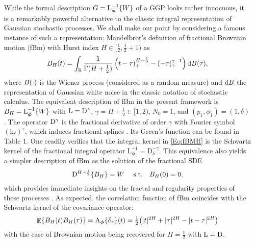 \documentclass[11pt, english,english]{article}
\newcommand{\R}{ \mathbb{R}}
\newcommand{\Lop}{{\rm L}}
\newcommand{\Dop}{{\rm D}}
\newcommand{\dint}{{\rm d}}
\def\V#1{{\boldsymbol{#1}}}         %
\def\Op#1{{\mathrm{#1}}}  %
\def\jj{\mathrm{i}}
\def\Exp{\mathop{\mathbb{E}}\nolimits}
\renewcommand{\[}{\begin{equation}}
\renewcommand{\]}[1]{\label{eq:#1}\end{equation}}
\def\Exp{\mathop{\mathbb{E}}\nolimits}
\def\Rand#1{{\uppercase{#1}}}         %
\def\gRand#1{{\uppercase{ #1}}}         %
\begin{document}
While the formal description $\gRand G=\Op L^{-1}_{\V \phi}\{\gRand W\}$ of a GGP looks rather innocuous, it is a remarkably powerful alternative to the classic integral representation of Gaussian stochastic processes. We shall make our point by considering a
famous instance of such a representation: Mandelbrot's definition \cite{Mandelbrot1968} of fractional Brownian motion (fBm) with Hurst index $H \in\big[\tfrac{1}{2},\tfrac{1}{2}+1 \big)$ as 
\begin{align}
\label{Eq:fBMH}
\Rand B_H(t)=\int_{\R }\frac{1}{\Gamma(H+\frac{1}{2})} \left(t-\tau)^{H-\frac{1}{2}}_+-(-\tau)_+^{\gamma-1}\right)\dint \Rand B(\tau),
\end{align}
where $\Rand B(\cdot)$ is the Wiener process (considered as a random measure) and $\dint\Rand B$ the representation of Gaussian white noise in the classic notation of stochastic calculus.
The equivalent description of fBm in the present framework is
$B_H=\Op L^{-1}_{\V \phi}\{\Rand W\}$ with $\Lop= \Dop^{\gamma}$, $\gamma=H+\frac{1}{2}  \in [1,2)$, $N_0=1$, and $(p_1,\phi_1)=(1,\delta)$. The operator $\Dop^{\gamma}$
is the fractional derivative of order $\gamma$ with Fourier symbol $(\jj \omega)^\gamma$, which induces fractional splines \cite{Unser2000}. Its Green's function can be found in Table 1. 
One readily verifies that the integral kernel in \eqref{Eq:fBMH} is the Schwartz kernel of the fractional integral operator $\Op L^{-1}_{\V \phi}=\Op D^{-\gamma}_{\delta}$. This equivalence also yields a simpler description of fBm as the solution of the fractional SDE
\begin{align}
\Dop^{H +\frac{1}{2}}\{\Rand B_H\}=\Rand W \quad  \mbox{ s.t.} \quad B_H(0)=0,\end{align}
which provides immediate insights on the fractal and regularity properties of these processes \cite{Blu2007a}.
As expected, the correlation function of fBm coincides with the Schwartz kernel of the covariance operator: 
\begin{align}
 \label{Eq:CovfBm}
 \Exp\{\Rand B_H(t)\Rand B_H(\tau) \}=\Op A_{\V \phi}\{\delta_\tau\}(t)=\tfrac{1}{2}\big(|t|^{2H}+|\tau|^{2H}-|t-\tau|^{2H} \big) \end{align}
with the case of Brownian motion being recovered for $H=\tfrac{1}{2}$ with $\Lop=\Dop$.
\end{document}
